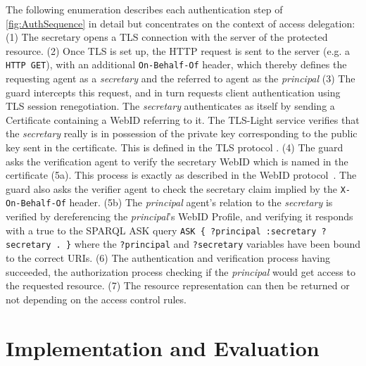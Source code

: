 \documentclass[a4paper]{llncs}
\begin{document}
The following enumeration describes each authentication step of \autoref{fig:AuthSequence} in detail but concentrates on the context of access delegation:
(1) The secretary  opens a TLS connection with the server of the protected resource.
(2) Once TLS is set up, the HTTP request is sent to the server (e.g. a \verb!HTTP GET!), with an additional \lstinline|On-Behalf-Of| header, which thereby defines the requesting agent as a \textit{secretary} and the referred to agent as the \textit{principal} 
(3) The guard intercepts this request, and  in turn requests client authentication using TLS session renegotiation.
The \textit{secretary} authenticates as itself by sending a Certificate containing a WebID referring to it.
The TLS-Light service verifies that the \textit{secretary} really is in possession of the private key corresponding to the public key sent in the certificate.
This is defined in the TLS protocol \cite{dierks-t-2012--a}.
(4) The guard asks the verification agent to verify the secretary WebID which is named in the certificate (5a).
This process is exactly as described in the WebID protocol~\cite{story-h-2009--a}.
The guard also asks the verifier agent to check the secretary claim implied by the \lstinline|X-On-Behalf-Of| header.
(5b) The \textit{principal} agent's relation to the \textit{secretary} is  verified by dereferencing the \textit{principal}'s WebID Profile, and verifying it responds with a true to the SPARQL ASK query \lstinline|ASK { ?principal :secretary ?secretary . }| where the \lstinline|?principal| and \lstinline|?secretary| variables have been bound to the correct URIs.
(6) The authentication and verification process having succeeded, the authorization process checking if the \textit{principal} would get access to the requested resource.
(7) The resource representation can then be returned or not depending on the access control rules.


\section{Implementation and Evaluation}\label{sec:eval}
\end{document}
